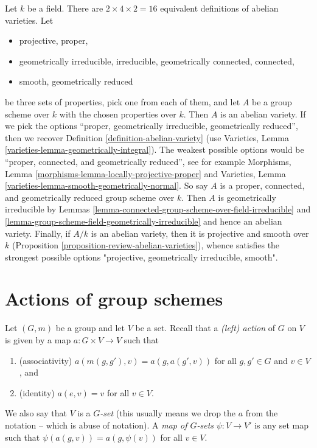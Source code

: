 \begin{remark}
\label{remark-16-equivalent}
Let $k$ be a field. There are $2 \times 4 \times 2 = 16$ equivalent
definitions of abelian varieties. Let
\begin{itemize}
\item projective, proper,
\item geometrically irreducible, irreducible, geometrically connected,
connected,
\item smooth, geometrically reduced
\end{itemize}
be three sets of properties, pick one from each of them, and let $A$
be a group scheme over $k$ with the chosen properties over $k$.
Then $A$ is an abelian variety.
If we pick the options ``proper, geometrically irreducible, geometrically
reduced'', then we recover Definition \ref{definition-abelian-variety}
(use Varieties, Lemma \ref{varieties-lemma-geometrically-integral}).
The weakest possible options would be ``proper, connected,
and geometrically reduced'', see for example
Morphisms, Lemma \ref{morphisms-lemma-locally-projective-proper} and
Varieties, Lemma \ref{varieties-lemma-smooth-geometrically-normal}.
So say $A$ is a proper, connected,
and geometrically reduced group scheme over $k$.
Then $A$ is geometrically irreducible by
Lemmas \ref{lemma-connected-group-scheme-over-field-irreducible} and
\ref{lemma-group-scheme-field-geometrically-irreducible}
and hence an abelian variety.
Finally, if $A/k$ is an abelian variety, then it is projective
and smooth over $k$ (Proposition
\ref{proposition-review-abelian-varieties}), whence satisfies
the strongest possible options "projective, geometrically irreducible, smooth".
\end{remark}







\section{Actions of group schemes}
\label{section-action-group-scheme}

\noindent
Let $(G, m)$ be a group and let $V$ be a set.
Recall that a {\it (left) action} of $G$ on $V$ is given
by a map $a : G \times V \to V$ such that
\begin{enumerate}
\item (associativity) $a(m(g, g'), v) = a(g, a(g', v))$ for all
$g, g' \in G$ and $v \in V$, and
\item (identity) $a(e, v) = v$ for all $v \in V$.
\end{enumerate}
We also say that $V$ is a {\it $G$-set} (this usually means we
drop the $a$ from the notation -- which is abuse of notation).
A {\it map of $G$-sets} $\psi : V \to V'$ is any set map
such that $\psi(a(g, v)) = a(g, \psi(v))$ for all $v \in V$.

